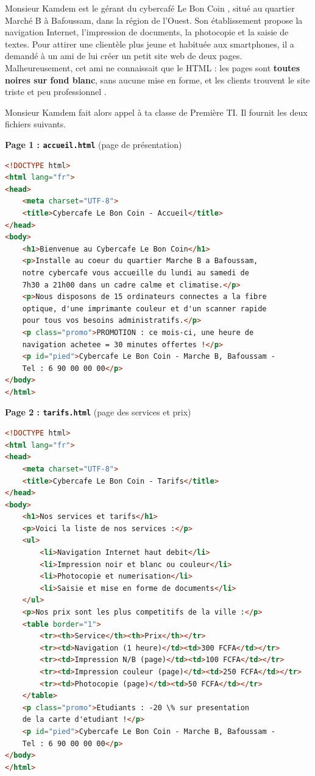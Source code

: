 \documentclass[11pt]{article}
\newcounter{popsec}
\newcounter{popsub}
\newcommand{\courssub}[1]{%
  \stepcounter{popsub}%
  \par\vspace{9pt}\noindent{\popxbold\fontsize{11.5}{13}\selectfont\color{popink}{\color{poporange}\thepopsec.\thepopsub}\hspace{6pt}#1}\par\nopagebreak\vspace{4pt}
}
\begin{document}
\courssub{Situation}

Monsieur Kamdem est le gérant du cybercafé \og Le Bon Coin \fg{}, situé au quartier Marché B à Bafoussam, dans la région de l'Ouest. Son établissement propose la navigation Internet, l'impression de documents, la photocopie et la saisie de textes. Pour attirer une clientèle plus jeune et habituée aux smartphones, il a demandé à un ami de lui créer un petit site web de deux pages. Malheureusement, cet ami ne connaissait que le HTML : les pages sont \textbf{toutes noires sur fond blanc}, sans aucune mise en forme, et les clients trouvent le site \og triste et peu professionnel \fg{}.

Monsieur Kamdem fait alors appel à ta classe de Première TI. Il fournit les deux fichiers suivants.

\textbf{Page 1 : \texttt{accueil.html}} (page de présentation)

\begin{lstlisting}[language=HTML]
<!DOCTYPE html>
<html lang="fr">
<head>
    <meta charset="UTF-8">
    <title>Cybercafe Le Bon Coin - Accueil</title>
</head>
<body>
    <h1>Bienvenue au Cybercafe Le Bon Coin</h1>
    <p>Installe au coeur du quartier Marche B a Bafoussam,
    notre cybercafe vous accueille du lundi au samedi de
    7h30 a 21h00 dans un cadre calme et climatise.</p>
    <p>Nous disposons de 15 ordinateurs connectes a la fibre
    optique, d'une imprimante couleur et d'un scanner rapide
    pour tous vos besoins administratifs.</p>
    <p class="promo">PROMOTION : ce mois-ci, une heure de
    navigation achetee = 30 minutes offertes !</p>
    <p id="pied">Cybercafe Le Bon Coin - Marche B, Bafoussam -
    Tel : 6 90 00 00 00</p>
</body>
</html>
\end{lstlisting}

\textbf{Page 2 : \texttt{tarifs.html}} (page des services et prix)

\begin{lstlisting}[language=HTML]
<!DOCTYPE html>
<html lang="fr">
<head>
    <meta charset="UTF-8">
    <title>Cybercafe Le Bon Coin - Tarifs</title>
</head>
<body>
    <h1>Nos services et tarifs</h1>
    <p>Voici la liste de nos services :</p>
    <ul>
        <li>Navigation Internet haut debit</li>
        <li>Impression noir et blanc ou couleur</li>
        <li>Photocopie et numerisation</li>
        <li>Saisie et mise en forme de documents</li>
    </ul>
    <p>Nos prix sont les plus competitifs de la ville :</p>
    <table border="1">
        <tr><th>Service</th><th>Prix</th></tr>
        <tr><td>Navigation (1 heure)</td><td>300 FCFA</td></tr>
        <tr><td>Impression N/B (page)</td><td>100 FCFA</td></tr>
        <tr><td>Impression couleur (page)</td><td>250 FCFA</td></tr>
        <tr><td>Photocopie (page)</td><td>50 FCFA</td></tr>
    </table>
    <p class="promo">Etudiants : -20 \% sur presentation
    de la carte d'etudiant !</p>
    <p id="pied">Cybercafe Le Bon Coin - Marche B, Bafoussam -
    Tel : 6 90 00 00 00</p>
</body>
</html>
\end{lstlisting}
\end{document}
